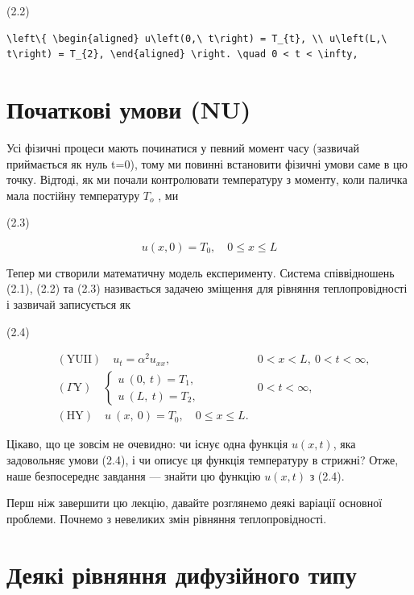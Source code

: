 \documentclass[
  ukrainian,
]{article}
\begin{document}
(2.2)

\begin{verbatim}
\left\{ \begin{aligned} u\left(0,\ t\right) = T_{t}, \\ u\left(L,\ t\right) = T_{2}, \end{aligned} \right. \quad 0 < t < \infty,
\end{verbatim}

\section{Початкові умови
(NU)}\label{ux43fux43eux447ux430ux442ux43aux43eux432ux456-ux443ux43cux43eux432ux438-nu}

Усі фізичні процеси мають починатися у певний момент часу (зазвичай
приймається як нуль t=0), тому ми повинні встановити фізичні умови саме
в цю точку. Відтоді, як ми почали контролювати температуру з моменту,
коли паличка мала постійну температуру \(T_{\mathrm{ }o}\) , ми

(2.3)

\[
u(x, 0) = T_0, \quad 0 \le x \le L
\]

Тепер ми створили математичну модель експерименту. Система співвідношень
(2.1), (2.2) та (2.3) називається задачею зміщення для рівняння
теплопровідності і зазвичай записується як

(2.4)

\[
\begin{aligned} & (\text{YUII}) \quad u_t = \alpha^2 u_{xx}, & 0 < x < L, \ 0 < t < \infty, \\ & \left( \Gamma \text{Y} \right) \quad \begin{cases} u \ (0, \ t) = T_1, \\ u \ (L, \ t) = T_2, \end{cases} & 0 < t < \infty, \\ & (\text{HY}) \quad u \ (x, \ 0) = T_0, \quad 0 \leqslant x \leqslant L. \end{aligned}
\]

Цікаво, що це зовсім не очевидно: чи існує одна функція \(u(x, t)\), яка
задовольняє умови (2.4), і чи описує ця функція температуру в стрижні?
Отже, наше безпосереднє завдання --- знайти цю функцію \(u(x, t)\) з
(2.4).

Перш ніж завершити цю лекцію, давайте розглянемо деякі варіації основної
проблеми. Почнемо з невеликих змін рівняння теплопровідності.

\section{Деякі рівняння дифузійного
типу}\label{ux434ux435ux44fux43aux456-ux440ux456ux432ux43dux44fux43dux43dux44f-ux434ux438ux444ux443ux437ux456ux439ux43dux43eux433ux43e-ux442ux438ux43fux443}
\end{document}

